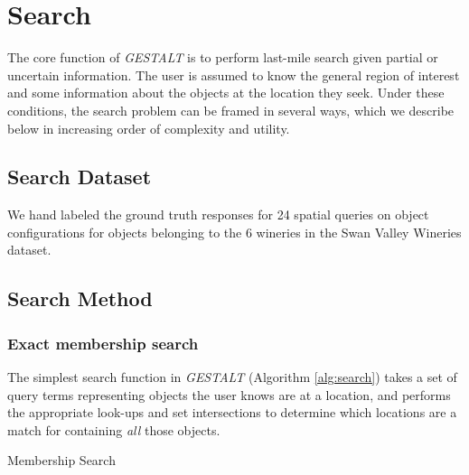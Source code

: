 \section{Search}
\label{section:search}

The core function of \textit{GESTALT} is to perform last-mile search given partial or uncertain information.
The user is assumed to know the general region of interest and some information about the objects at the location they seek.
Under these conditions, the search problem can be framed in several ways, which we describe below in increasing order of complexity and utility.

\subsection{Search Dataset}
We hand labeled the ground truth responses for 24 spatial queries on object configurations for objects belonging to the 6 wineries in the Swan Valley Wineries dataset. 

\subsection{Search Method}

\subsubsection{\textbf{Exact membership search}}
The simplest search function in \emph{GESTALT} (Algorithm \ref{alg:search}) takes a set of query terms representing objects the user knows are at a location, and performs the appropriate look-ups and set intersections to determine which locations are a match for containing \textit{all} those objects.

\begin{algorithm}
    \caption{Membership Search}\label{alg:search}
    \begin{algorithmic}
        \State{- - - - -}
            \EndFor
            \EndProcedure
    \end{algorithmic}
\end{algorithm}

